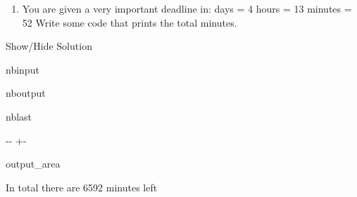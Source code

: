 \documentclass[letterpaper,10pt,english]{sphinxmanual}
\begin{document}
\begin{enumerate}
%
\setcounter{enumi}{7}
\item {} 
\sphinxAtStartPar
You are given a very important deadline in: days = 4 hours = 13 minutes = 52
Write some code that prints the total minutes.

\end{enumerate}



\sphinxAtStartPar
Show/Hide Solution





\begin{sphinxuseclass}{nbinput}
{
\begin{sphinxVerbatim}[commandchars=\\\{\}]
\llap{\color{nbsphinxin}[27]:\,\hspace{\fboxrule}\hspace{\fboxsep}}  
  
  

      
\end{sphinxVerbatim}
}

\end{sphinxuseclass}
\begin{sphinxuseclass}{nboutput}
\begin{sphinxuseclass}{nblast}
{

\kern-\sphinxverbatimsmallskipamount\kern-\baselineskip
\kern+\FrameHeightAdjust\kern-\fboxrule
\vspace{\nbsphinxcodecellspacing}

\begin{sphinxuseclass}{output_area}
\begin{sphinxuseclass}{}


\begin{sphinxVerbatim}[commandchars=\\\{\}]
In total there are 6592 minutes left
\end{sphinxVerbatim}



\end{sphinxuseclass}
\end{sphinxuseclass}
}

\end{sphinxuseclass}
\end{sphinxuseclass}
\end{document}
